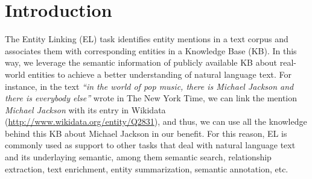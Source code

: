 \documentclass{llncs}
\begin{document}
\section{Introduction} 
\label{sec:intro}


The Entity Linking (EL) task identifies entity mentions in a text corpus and associates them with corresponding entities in a Knowledge Base (KB). In this way, we leverage the semantic information of publicly available KB about real-world entities to achieve a better understanding of natural language text. For instance, in the text \textit{``in the world of pop music, there is Michael Jackson and there is everybody else''} wrote in The New York Time, we can link the mention \textit{Michael Jackson} with its entry in Wikidata (\url{http://www.wikidata.org/entity/Q2831}), and thus, we can use all the knowledge behind this KB about Michael Jackson in our benefit. For this reason, EL is commonly used as support to other tasks that deal with natural language text and its underlaying semantic, among them semantic search, relationship extraction, text enrichment, entity summarization, semantic annotation, etc. 


\end{document}
